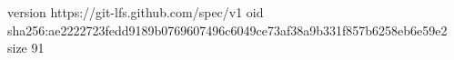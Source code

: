 version https://git-lfs.github.com/spec/v1
oid sha256:ae2222723fedd9189b0769607496c6049ce73af38a9b331f857b6258eb6e59e2
size 91
